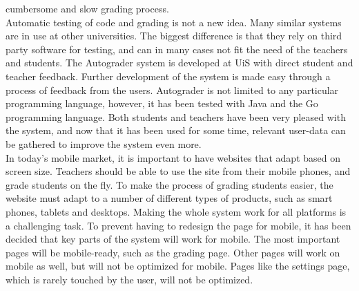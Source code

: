 cumbersome and slow grading process. \\Automatic testing of code and grading is not a new idea. Many similar systems are in use at other universities. The biggest difference is that they rely on third party software for testing, and can in many cases not fit the need of the teachers and students. The Autograder system is developed at UiS with direct student and teacher feedback. Further development of the system is made easy through a process of feedback from the users. Autograder is not limited to any particular programming language, however, it has been tested with Java and the Go programming language. Both students and teachers have been very pleased with the system, and now that it has been used for some time, relevant user-data can be gathered to improve the system even more. \\In today's mobile market, it is important to have websites that adapt based on screen size. Teachers should be able to use the site from their mobile phones, and grade students on the fly. To make the process of grading students easier, the website must adapt to a number of different types of products, such as smart phones, tablets and desktops. Making the whole system work for all platforms is a challenging task. To prevent having to redesign the page for mobile, it has been decided that key parts of the system will work for mobile. The most important pages will be mobile-ready, such as the grading page. Other pages will work on mobile as well, but will not be optimized for mobile. Pages like the settings page, which is rarely touched by the user, will not be optimized.

